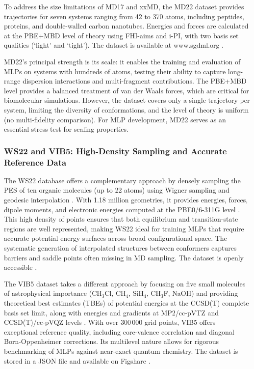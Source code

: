 \documentclass[12pt]{article}
\begin{document}
To address the size limitations of MD17 and xxMD, the MD22 dataset \cite{ds22-21} provides trajectories for seven systems ranging from 42 to 370 atoms, including peptides, proteins, and double-walled carbon nanotubes. Energies and forces are calculated at the PBE+MBD level of theory \cite{ds22-75,ds22-76} using FHI-aims \cite{ds22-80} and i-PI, with two basis set qualities (`light' and `tight'). The dataset is available at www.sgdml.org \cite{ds22-130}.

MD22's principal strength is its scale: it enables the training and evaluation of MLPs on systems with hundreds of atoms, testing their ability to capture long-range dispersion interactions and multi-fragment contributions. The PBE+MBD level provides a balanced treatment of van der Waals forces, which are critical for biomolecular simulations. However, the dataset covers only a single trajectory per system, limiting the diversity of conformations, and the level of theory is uniform (no multi-fidelity comparison). For MLP development, MD22 serves as an essential stress test for scaling properties.

\subsubsection*{WS22 and VIB5: High-Density Sampling and Accurate Reference Data}

The WS22 database \cite{ds23-50} offers a complementary approach by densely sampling the PES of ten organic molecules (up to 22 atoms) using Wigner sampling \cite{ds23-131} and geodesic interpolation \cite{ds23-132}. With 1.18 million geometries, it provides energies, forces, dipole moments, and electronic energies computed at the PBE0/6-311G level \cite{ds23-57}. This high density of points ensures that both equilibrium and transition-state regions are well represented, making WS22 ideal for training MLPs that require accurate potential energy surfaces across broad configurational space. The systematic generation of interpolated structures between conformers captures barriers and saddle points often missing in MD sampling. The dataset is openly accessible \cite{ds23-133}.

The VIB5 dataset \cite{ds24-48} takes a different approach by focusing on five small molecules of astrophysical importance (CH$_3$Cl, CH$_4$, SiH$_4$, CH$_3$F, NaOH) and providing theoretical best estimates (TBEs) of potential energies at the CCSD(T) complete basis set limit, along with energies and gradients at MP2/cc-pVTZ and CCSD(T)/cc-pVQZ levels \cite{ds24-134,ds24-135,ds24-136}. With over 300\,000 grid points, VIB5 offers exceptional reference quality, including core-valence correlation and diagonal Born-Oppenheimer corrections. Its multilevel nature allows for rigorous benchmarking of MLPs against near-exact quantum chemistry. The dataset is stored in a JSON file and available on Figshare \cite{ds24-137}.
\end{document}
